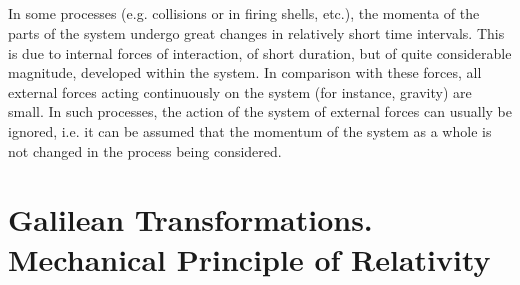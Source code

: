\subsection{}\label{2.7.4} In some processes (e.g. collisions or in firing shells, etc.), the momenta of the parts of the system undergo great changes in relatively short time intervals. This is due to internal forces of interaction, of short duration, but of quite considerable magni­tude, developed within the system. In comparison with these forces, all external forces acting continuously on the system (for instance, gravity) are small. In such processes, the action of the system of external forces can usually be ignored, i.e. it can be assumed that the momentum of the system as a whole is not changed in the process being considered.

\section[Galilean Transformations]{Galilean Transformations. Mechanical Principle of Relativity}
\label{sec-2.8} 

